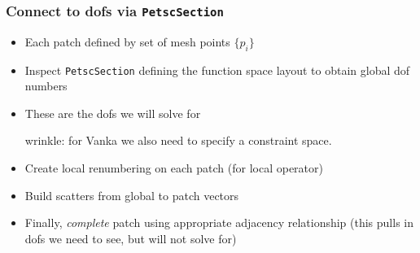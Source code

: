 \documentclass[presentation,aspectratio=43,10pt]{beamer}
\begin{document}
\begin{frame}
  \frametitle{Connect to dofs via \texttt{PetscSection}}
  \begin{itemize}
  \item Each patch defined by set of mesh points $\{p_i\}$
  \item Inspect \texttt{PetscSection} defining the function space
    layout to obtain global dof numbers
  \item These are the dofs we will solve for
    \begin{flushright}
      {\small wrinkle: for Vanka we also need to specify a constraint space.}
    \end{flushright}
  \item Create local renumbering on each patch (for local operator)
  \item Build scatters from global to patch vectors
  \item Finally, \emph{complete} patch using appropriate adjacency
    relationship (this pulls in dofs we need to see, but will not
    solve for)
  \end{itemize}
\end{frame}
\end{document}
